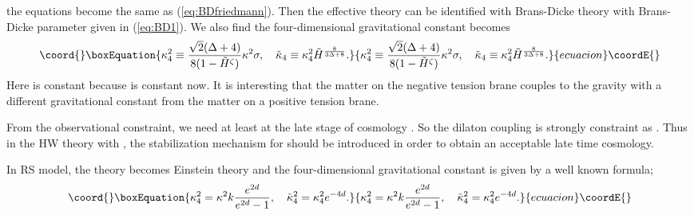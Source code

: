 \documentclass[a4paper,11pt]{article}
\begin{document}
the equations become the same as (\ref{eq:BDfriedmann}).
Then the effective theory can be identified with Brans-Dicke theory with 
Brans-Dicke parameter \myHighlight{$\omega$}\coordHE{} given in  (\ref{eq:BD1}). 
We also find the four-dimensional gravitational constant becomes
\begin{equation}\coord{}\boxEquation{
\kappa_4^2 \equiv \frac{\sqrt{2}(\Delta +4)}{8(1-\tilde{H}^{\zeta})}
\kappa^2 \sigma, \quad 
\tilde{\kappa}_4 \equiv 
\kappa_4^2 \tilde{H}^{\frac{8}{3 \Delta+8}}.
}{
\kappa_4^2 \equiv \frac{\sqrt{2}(\Delta +4)}{8(1-\tilde{H}^{\zeta})}
\kappa^2 \sigma, \quad 
\tilde{\kappa}_4 \equiv 
\kappa_4^2 \tilde{H}^{\frac{8}{3 \Delta+8}}.
}{ecuacion}\coordE{}\end{equation}
Here \coordHE{} is constant because \coordHE{} is constant now. 
It is interesting that the matter on the negative tension brane
couples to the gravity with a different gravitational constant
from the matter on a positive tension brane.

From the observational constraint, we need \coordHE{} 
at least at the late stage of cosmology \cite{Will}. So the dilaton
coupling is strongly constraint as \coordHE{}. 
Thus in the HW theory with \coordHE{}, the stabilization mechanism for 
\myHighlight{$\phi$}\coordHE{} should be introduced in order to obtain an acceptable
late time cosmology.
 
In RS model, the theory becomes Einstein theory and the four-dimensional
gravitational constant is given by a well known formula;
\begin{equation}\coord{}\boxEquation{
\kappa_4^2= \kappa^2 k \frac{e^{2d}}{e^{2d}-1}, \quad \tilde{\kappa}_4^2
=\kappa_4^2 e^{-4d}. 
}{
\kappa_4^2= \kappa^2 k \frac{e^{2d}}{e^{2d}-1}, \quad \tilde{\kappa}_4^2
=\kappa_4^2 e^{-4d}. 
}{ecuacion}\coordE{}\end{equation}
\end{document}
